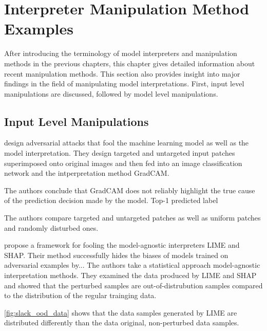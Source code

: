 \section{Interpreter Manipulation Method Examples}
\label{sec:manipulations}

After introducing the terminology of model interpreters and manipulation methods in the previous chapters, this chapter gives detailed information about recent manipulation methods. This section also provides insight into major findings in the field of manipulating model interpretations. First, input level manipulations are discussed, followed by model level manipulations. 

\subsection{Input Level Manipulations}

\newline
\cite{subramanya2019fooling} design adversarial attacks that fool the machine learning model as well as the model interpretation. 
They design targeted and untargeted input patches superimposed onto original images and then fed into an image classification network and the intperpretation method GradCAM. 

The authors conclude that GradCAM does not reliably highlight the true cause of the prediction decision made by the model. 
Top-1 predicted label 

The authors compare targeted and untargeted patches as well as uniform patches and randomly disturbed ones. 



\newline
\cite{advlime_aies20} propose a framework for fooling the model-agnostic interpreters LIME and SHAP. Their method successfully hides the biases of models trained on adversarial examples by... 
The authors take a statistical approach model-agnostic interpretation methods. They examined the data produced by LIME and SHAP and showed that the perturbed samples are out-of-distrubution samples compared to the distribution of the regular trainging data. 

\autoref{fig:slack_ood_data} shows that the data samples generated by LIME are distributed differently than the data original, non-perturbed data samples. 

